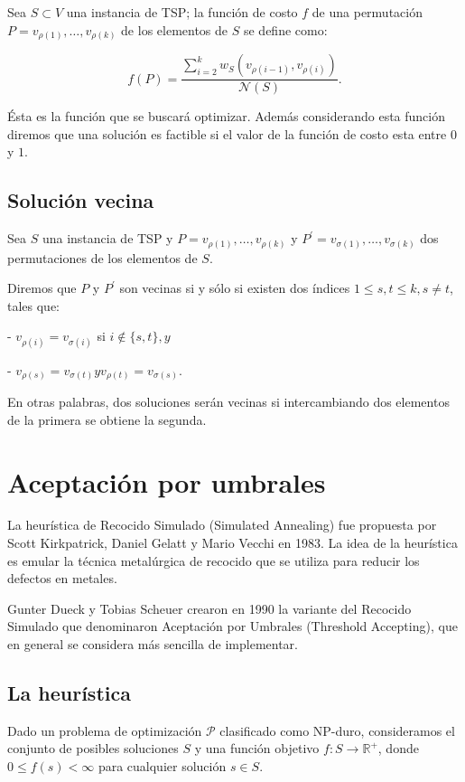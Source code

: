 \documentclass[spanish,12pt,letterpaper]{article}
\begin{document}
	Sea $S \subset V$ una instancia de TSP; la función de costo $f$ de una permutación $P=v_{\rho(1)}, \ldots, v_{\rho(k)}$ de los elementos de $S$ se define como:
	
	\[
	f(P)=\frac{\sum_{i=2}^{k} w_{S}\left(v_{\rho(i-1)}, v_{\rho(i)}\right)}{\mathscr{N}(S)} .
	\]
	
	Ésta es la función que se buscará optimizar. Además considerando esta función diremos que una solución es factible si el valor de la función de costo esta entre $0$ y $1$.
	\subsection{Solución vecina}
	 Sea $S$ una instancia de TSP y $P=v_{\rho(1)}, \ldots, v_{\rho(k)}$ y $P^{\prime}=v_{\sigma(1)}, \ldots, v_{\sigma(k)}$ dos permutaciones de los elementos de $S$.
	
	Diremos que $P$ y $P^{\prime}$ son vecinas si y sólo si existen dos índices $1 \leq s, t \leq k, s \neq t$, tales que:
	
	- $v_{\rho(i)}=v_{\sigma(i)}$ si $i \notin\{s, t\}, y$
	
	- $v_{\rho(s)}=v_{\sigma(t)} y v_{\rho(t)}=v_{\sigma(s)}$.
	
	En otras palabras, dos soluciones serán vecinas si intercambiando dos elementos de la primera se obtiene la segunda.
	
	\section{Aceptación por umbrales}
	La heurística de Recocido Simulado (Simulated Annealing) fue propuesta por Scott Kirkpatrick, Daniel Gelatt y Mario Vecchi en 1983. La idea de la heurística es emular la técnica metalúrgica de recocido que se utiliza para reducir los defectos en metales.
	
	Gunter Dueck y Tobias Scheuer crearon en 1990 la variante del Recocido Simulado que denominaron Aceptación por Umbrales (Threshold Accepting), que en general se considera más sencilla de implementar.
	
	\subsection{La heurística}
	Dado un problema de optimización $\mathscr{P}$ clasificado como NP-duro, consideramos el conjunto de posibles soluciones $S$ y una función objetivo $f: S \rightarrow \mathbb{R}^{+}$, donde $0 \leq f(s) < \infty$ para cualquier solución $s \in S$.
	
\end{document}
